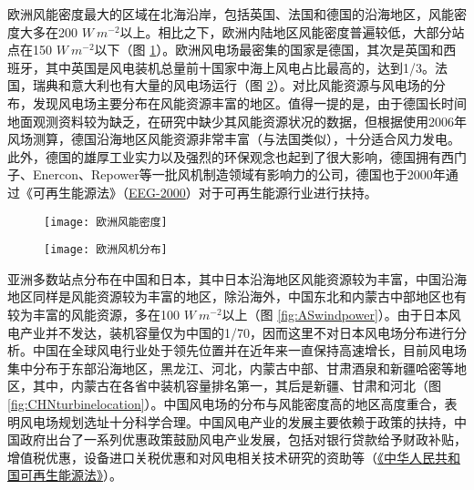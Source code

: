 欧洲风能密度最大的区域在北海沿岸，包括英国、法国和德国的沿海地区，风能密度大多在200 $W ~ m^{-2}$以上。相比之下，欧洲内陆地区风能密度普遍较低，大部分站点在150 $W ~ m^{-2}$以下（图 \ref{fig:EUwindpower}）。欧洲风电场最密集的国家是德国，其次是英国和西班牙，其中英国是风电装机总量前十国家中海上风电占比最高的，达到1/3。法国，瑞典和意大利也有大量的风电场运行（图 \ref{fig:EUturbinelocation}）。对比风能资源与风电场的分布，发现风电场主要分布在风能资源丰富的地区。值得一提的是，由于德国长时间地面观测资料较为缺乏，在研究中缺少其风能资源状况的数据，但根据\citet{lu2009global}使用2006年风场测算，德国沿海地区风能资源非常丰富（与法国类似），十分适合风力发电。此外，德国的雄厚工业实力以及强烈的环保观念也起到了很大影响，德国拥有西门子、Enercon、Repower等一批风机制造领域有影响力的公司，德国也于2000年通过《可再生能源法》（\href{https://www.lexadin.nl/wlg/legis/nofr/eur/arch/ger/resact.pdf}{EEG-2000}）对于可再生能源行业进行扶持。

\begin{figure}[!htbp]
    \centering
    \texttt{[image: 欧洲风能密度]}
    \label{fig:EUwindpower}
\end{figure}

\begin{figure}[!htbp]
    \centering
    \texttt{[image: 欧洲风机分布]}
    \label{fig:EUturbinelocation}
\end{figure}

亚洲多数站点分布在中国和日本，其中日本沿海地区风能资源较为丰富，中国沿海地区同样是风能资源较为丰富的地区，除沿海外，中国东北和内蒙古中部地区也有较为丰富的风能资源，多在100 $W ~ m^{-2}$以上（图 \ref{fig:ASwindpower}）。由于日本风电产业并不发达，装机容量仅为中国的1/70，因而这里不对日本风电场分布进行分析。中国在全球风电行业处于领先位置并在近年来一直保持高速增长，目前风电场集中分布于东部沿海地区，黑龙江、河北，内蒙古中部、甘肃酒泉和新疆哈密等地区，其中，内蒙古在各省中装机容量排名第一，其后是新疆、甘肃和河北（图 \ref{fig:CHNturbinelocation}）。中国风电场的分布与风能密度高的地区高度重合，表明风电场规划选址十分科学合理。中国风电产业的发展主要依赖于政策的扶持，中国政府出台了一系列优惠政策鼓励风电产业发展，包括对银行贷款给予财政补贴，增值税优惠，设备进口关税优惠和对风电相关技术研究的资助等（\href{http://www.nea.gov.cn/2017-11/02/c_136722869.htm}{《中华人民共和国可再生能源法》}）。

